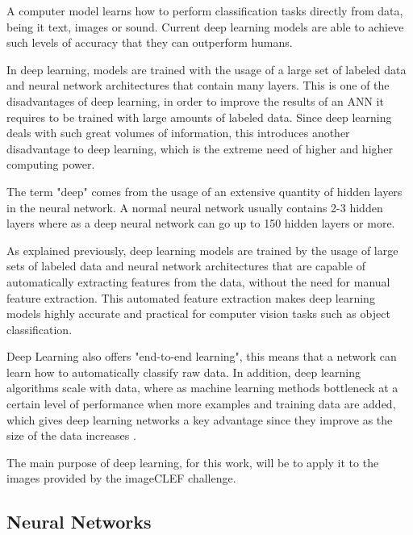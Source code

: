     \par A computer model learns how to perform classification tasks directly from data, being it text, images or sound. Current deep learning models are able to achieve such levels of accuracy that they can outperform humans.

    \par In deep learning, models are trained with the usage of a large set of labeled data and neural network architectures that contain many layers. This is one of the disadvantages of deep learning, in order to improve the results of an ANN it requires to be trained with large amounts of labeled data. Since deep learning deals with such great volumes of information, this introduces another disadvantage to deep learning, which is the extreme need of higher and higher computing power.

   
        
    \par The term "deep" comes from the usage of an extensive quantity of hidden layers in the neural network. A normal neural network usually contains 2-3 hidden layers where as a deep neural network can go up to 150 hidden layers or more.

    \par As explained previously, deep learning models are trained by the usage of  large sets of labeled data and neural network architectures that are capable of automatically extracting features from the data, without the need for manual feature extraction. This automated feature extraction makes deep learning models highly accurate and practical for computer vision tasks such as object classification. 
    
    \par Deep Learning also offers "end-to-end learning", this means that a network can learn how to automatically classify raw data. In addition, deep learning algorithms scale with data, where as machine learning methods bottleneck at a certain level of performance when more examples and training data are added, which gives deep learning networks a key advantage since they improve as the size of the data increases \cite{mathworks_deeplearning}.


    The main purpose of deep learning, for this work, will be to apply it to the images provided by the imageCLEF challenge.


\subsection{Neural Networks}
\label{sec:neuralnet}

